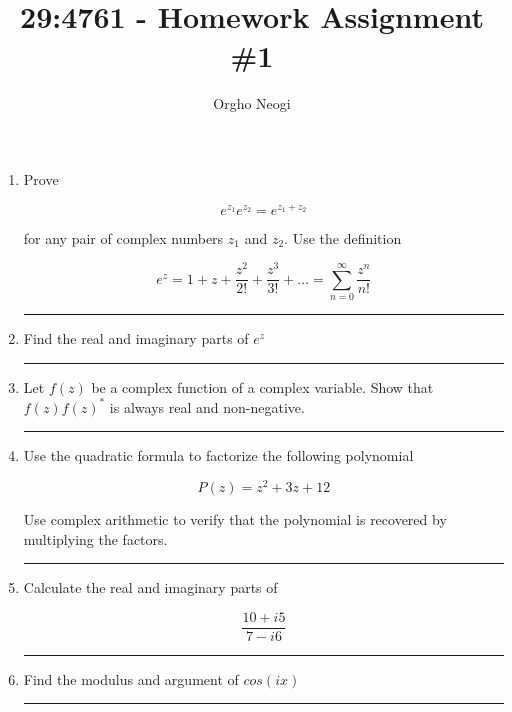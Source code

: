 \documentclass[12pt, oneside]{article}
\title{29:4761 - Homework Assignment \#1}
\author{Orgho Neogi}
\date{}
\newenvironment{answer}
  {\vspace*{0.2cm} \rule{12cm}{0.02cm} \vspace*{0.2cm}}
  {\vspace*{0.2cm}}
\begin{document}
\maketitle

\begin{enumerate}
  \item Prove

  \begin{equation*}
    e^{z_1}e^{z_2} = e^{z_1 + z_2}
  \end{equation*}

  for any pair of complex numbers $z_1$ and $z_2$. Use the definition

  \begin{equation*}
    e^z = 1 + z + \frac{z^2}{2!} + \frac{z^3}{3!} + \dots = \sum_{n=0}^{\infty} \frac{z^n}{n!}
  \end{equation*}

    \begin{answer}

    \end{answer}

  \item Find the real and imaginary parts of $e^z$

    \begin{answer}

    \end{answer}

  \item Let $f(z)$ be a complex function of a complex variable. Show that $f(z)f(z)^*$ is always real and non-negative.

    \begin{answer}

    \end{answer}

  \item Use the quadratic formula to factorize the following polynomial

  \begin{equation*}
    P(z) = z^2 + 3z + 12
  \end{equation*}

  Use complex arithmetic to verify that the polynomial is recovered by multiplying the factors.

    \begin{answer}

    \end{answer}

  \item Calculate the real and imaginary parts of

  \begin{equation*}
    \frac{10+i5}{7-i6}
  \end{equation*}

    \begin{answer}

    \end{answer}

  \item Find the modulus and argument of $cos(ix)$

    \begin{answer}

    \end{answer}


\end{enumerate}
\end{document}
